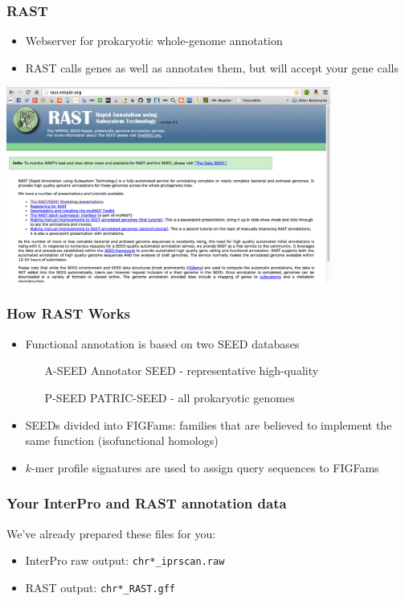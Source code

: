 \documentclass[table]{beamer}
\begin{document}
    \begin{frame}
      \frametitle{RAST}   
      \begin{itemize}
        \item Webserver for prokaryotic whole-genome annotation
        \item RAST calls genes as well as annotates them, but will accept your gene calls
      \end{itemize}
      \begin{center}
        \includegraphics[width=0.8\textwidth]{images/rast} 
      \end{center}        
    \end{frame}

    \begin{frame}
      \frametitle{How RAST Works}   
      \begin{itemize} 
        \item Functional annotation is based on two SEED databases
        \begin{itemize}
          \item [A-SEED] Annotator SEED - representative high-quality
          \item [P-SEED] PATRIC-SEED - all prokaryotic genomes
        \end{itemize}
        \item SEEDs divided into FIGFams: families that are believed to implement the same function (isofunctional homologs)
        \item $k$-mer profile signatures are used to assign query sequences to FIGFams
      \end{itemize}
    \end{frame}

    \begin{frame}
      \frametitle{Your InterPro and RAST annotation data}
      We've already prepared these files for you:
      \begin{itemize}
        \item InterPro raw output: \texttt{chr*\_iprscan.raw}
        \item RAST output: \texttt{chr*\_RAST.gff}
      \end{itemize}
    \end{frame}
\end{document}
